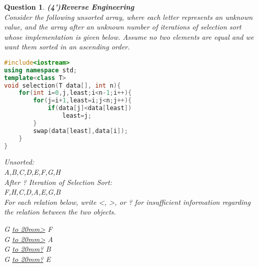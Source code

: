 \documentclass{article}
\newtheorem{Q}{Question}
\begin{document}
\begin{Q}\textbf{(4')Reverse Engineering}\\
	Consider the following unsorted array, where each letter represents an unknown value, and the array after an unknown number of iterations of selection sort whose implementation is given below. Assume no two elements are equal and we want them sorted in an ascending order.

	\hrulefill
	\rm{
		\begin{lstlisting}[language=C++]
#include<iostream>
using namespace std;
template<class T>
void selection(T data[], int n){
	for(int i=0,j,least;i<n-1;i++){
		for(j=i+1,least=i;j<n;j++){
			if(data[j]<data[least])
				least=j;
		}
		swap(data[least],data[i]);
	}
}
\end{lstlisting}
	}

	\vspace{1cm}
	Unsorted:\\
	A,B,C,D,E,F,G,H\\


	After ? Iteration of Selection Sort:\\
	F,H,C,D,A,E,G,B\\


	For each relation below, write \textless, \textgreater, or ? for insufficient information regarding the relation between the two objects.\\

	\begin{center}
		G \underline{\hbox to 20mm{\textgreater}} F\\

		G \underline{\hbox to 20mm{\textgreater}} A\\

		G \underline{\hbox to 20mm{?}} B\\

		G \underline{\hbox to 20mm{?}} E\\
	\end{center}




\end{Q}



\pagebreak
\end{document}
